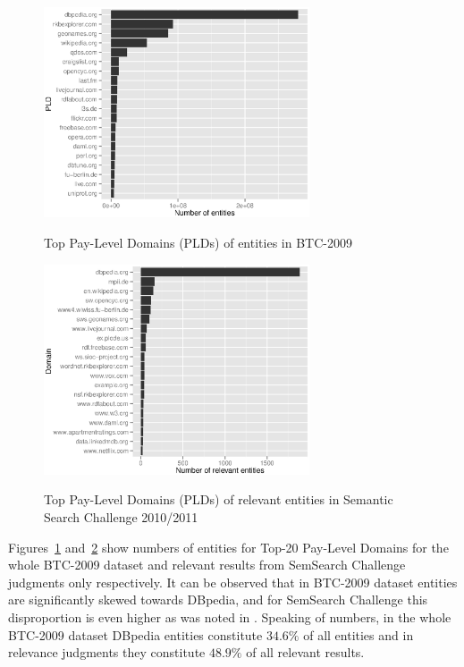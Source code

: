 \documentclass{article}
\begin{document}
\begin{figure}[!tbp]
  \caption{Top Pay-Level Domains (PLDs) of entities in BTC-2009}
  \centering
  \includegraphics[width=0.7\textwidth]{../btc-2009}
  \label{fig:btc2009}
\end{figure}
\begin{figure}[!tbp]
  \caption{Top Pay-Level Domains (PLDs) of relevant entities in Semantic Search
    Challenge 2010/2011}
  \centering
  \includegraphics[width=0.7\textwidth]{../relevant}
  \label{fig:relevant}
\end{figure}

Figures~\ref{fig:btc2009} and~\ref{fig:relevant} show numbers of entities for
Top-20 Pay-Level Domains for the whole BTC-2009 dataset and relevant results
from SemSearch Challenge judgments only respectively. It can be observed that in
BTC-2009 dataset entities are significantly skewed towards DBpedia, and for
SemSearch Challenge this disproportion is even higher as was noted in
\cite{balog2013test}. Speaking of numbers, in the whole BTC-2009 dataset
DBpedia entities constitute $34.6\%$ of all entities and in relevance judgments
they constitute $48.9\%$ of all relevant results.


{}

\end{document}
